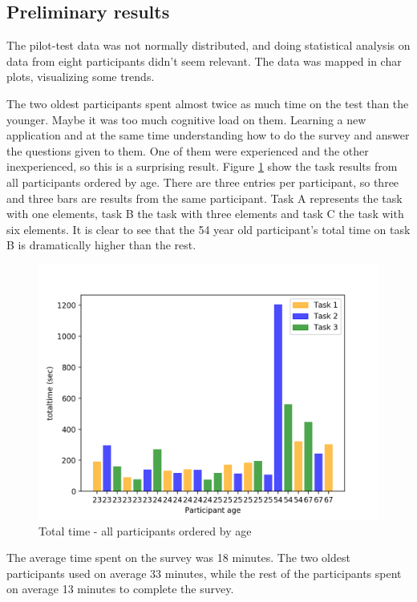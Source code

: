 \subsection{Preliminary results}\label{sec:preliminalyresult}
The pilot-test data was not normally distributed, and doing statistical analysis on data from eight participants didn't seem relevant. The data was mapped in char plots, visualizing some trends. 

The two oldest participants spent almost twice as much time on the test than the younger. Maybe it was too much cognitive load on them. Learning a new application and at the same time understanding how to do the survey and answer the questions given to them. One of them were experienced and the other inexperienced, so this is a surprising result. Figure \ref{fig:allparticipantssortedageparticipantexclude4labelage} show the task results from all participants ordered by age. There are three entries per participant, so three and three bars are results from the same participant. Task A represents the task with one elements, task B the task with three elements and task C the task with six elements.  It is clear to see that the 54 year old participant's total time on task B is dramatically higher than the rest.

\begin{figure}[H]
	\centering
	\includegraphics[width=0.7\linewidth]{fig/allParticipants_sorted_Age_Participant_exclude4_labelage}
	\caption[Total time, all]{Total time - all participants ordered by age}
	\label{fig:allparticipantssortedageparticipantexclude4labelage}
\end{figure}

The average time spent on the survey was 18 minutes. The two oldest participants used on average 33 minutes, while the rest of the participants spent on average 13 minutes to complete the survey. 

